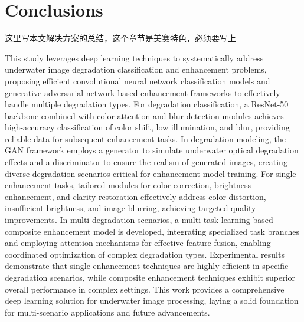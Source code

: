\documentclass{apmcmthesis}                                             %
\begin{document}


\section{Conclusions}

这里写本文解决方案的总结，这个章节是美赛特色，必须要写上

This study leverages deep learning techniques to systematically address underwater image degradation classification and enhancement problems, proposing efficient convolutional neural network classification models and generative adversarial network-based enhancement frameworks to effectively handle multiple degradation types. For degradation classification, a ResNet-50 backbone combined with color attention and blur detection modules achieves high-accuracy classification of color shift, low illumination, and blur, providing reliable data for subsequent enhancement tasks. In degradation modeling, the GAN framework employs a generator to simulate underwater optical degradation effects and a discriminator to ensure the realism of generated images, creating diverse degradation scenarios critical for enhancement model training. For single enhancement tasks, tailored modules for color correction, brightness enhancement, and clarity restoration effectively address color distortion, insufficient brightness, and image blurring, achieving targeted quality improvements. In multi-degradation scenarios, a multi-task learning-based composite enhancement model is developed, integrating specialized task branches and employing attention mechanisms for effective feature fusion, enabling coordinated optimization of complex degradation types. Experimental results demonstrate that single enhancement techniques are highly efficient in specific degradation scenarios, while composite enhancement techniques exhibit superior overall performance in complex settings. This work provides a comprehensive deep learning solution for underwater image processing, laying a solid foundation for multi-scenario applications and future advancements.
\end{document}
